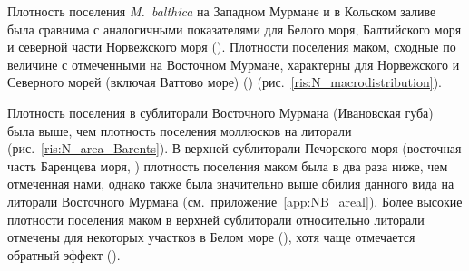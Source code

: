 Плотность поселения {\it M.~balthica} на Западном Мурмане и в Кольском заливе была сравнима с аналогичными показателями для Белого моря, Балтийского моря и северной части Норвежского моря (\cite{Semenova_1974, Aschan_1988, Maximovich_et_al_1991, Bonsdorff_et_al_1995, Bostrom_Bonsdorff_2000, Oug_2001, Laine_et_al_2003, Khaitov_et_al_2007, Varfolomeeva_Naumov_2013}).
Плотности поселения маком, сходные по величине с отмеченными на Восточном Мурмане, характерны для Норвежского и Северного морей (включая Ваттово море) (\cite{Brady_1943, Sneli_1968, Stromgren_et_al_1973, Beukema_1976, Jensen_Jensen_1985, Jensen_et_al_1985, Madsen_Jensen_1987, Beukema_1979, Zwarts_Wanink_1993, Reise_et_al_1994}) (рис.~\ref{ris:N_macrodistribution}).

Плотность поселения в сублиторали Восточного Мурмана (Ивановская губа) была выше, чем плотность поселения моллюсков на литорали (рис.~\ref{ris:N_area_Barents}).
В верхней сублиторали Печорского моря (восточная часть Баренцева моря, \cite{Denisenko_et_al_2003}) плотность поселения маком была в два раза ниже, чем отмеченная нами, однако также была значительно выше обилия данного вида на литорали Восточного Мурмана (см.~приложение~\ref{app:NB_areal}).
Более высокие плотности поселения маком в верхней сублиторали относительно литорали отмечены для некоторых участков в Белом море (\cite{Semenova_1974}), хотя чаще отмечается обратный эффект (\cite{Semenova_1974, Maximovich_et_al_1991}).

